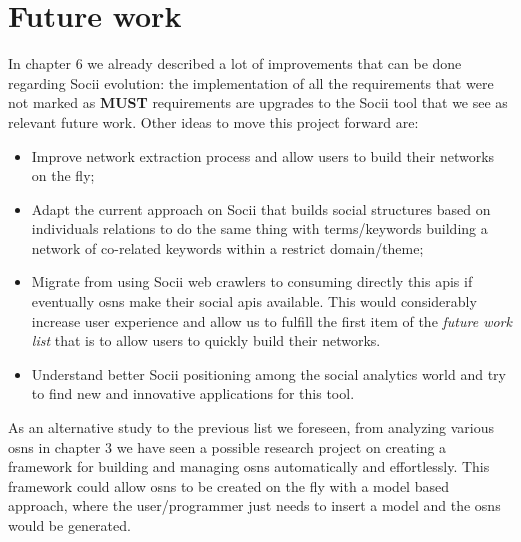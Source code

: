 \section{Future work}
In chapter 6 we already described a lot of improvements that can be done regarding Socii evolution: the implementation of all the requirements that were not marked as \textbf{MUST} requirements are upgrades to the Socii tool that we see as relevant future work. Other ideas to move this project forward are:

\begin{itemize}
    \item Improve network extraction process and allow users to build their networks on the fly;
    \item Adapt the current approach on Socii that builds social structures based on individuals relations to do the same thing with terms/keywords
    building a network of co-related keywords within a restrict domain/theme;
    \item Migrate from using Socii web crawlers to consuming directly this \glspl{api} if eventually \glspl{osn} make their social \glspl{api} available. This would considerably increase user experience and allow us to fulfill the first item of the \textit{future work list} that is to allow users to quickly build their networks.
    \item Understand better Socii positioning among the social analytics world and try to find new and innovative applications for this tool.
\end{itemize}

As an alternative study to the previous list we foreseen, from analyzing various \glspl{osn} in chapter 3 we have seen a possible research project on creating a framework for building and managing \glspl{osn} automatically and effortlessly. This framework could allow \glspl{osn} to be created on the fly with a model based approach, where the user/programmer just needs to insert a model and the \glspl{osn} would be generated.


